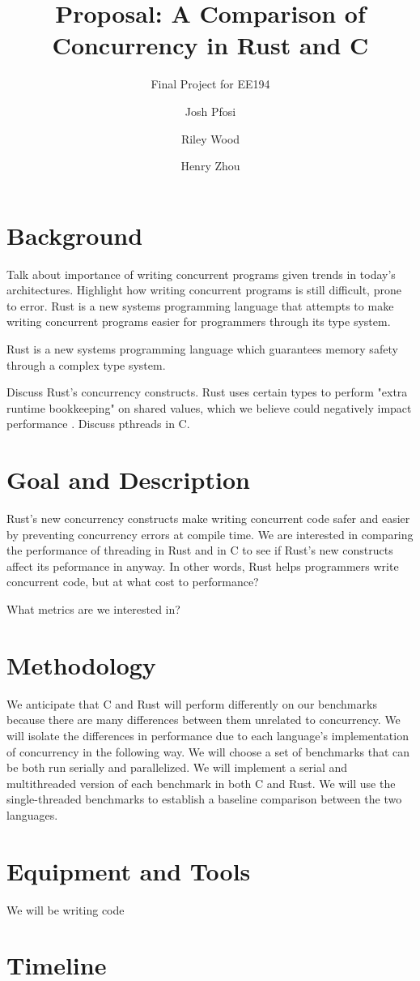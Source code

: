 \documentclass{scrartcl}
\title{Proposal: A Comparison of Concurrency in Rust and C}
\subtitle{Final Project for EE194}
\author{
    Josh Pfosi\\
    \and
    Riley Wood\\
    \and
    Henry Zhou\\
}
\begin{document}
\maketitle


\section*{Background}
Talk about importance of writing concurrent programs given trends in today's architectures. Highlight how writing concurrent programs is still difficult, prone to error. Rust is a new systems programming language that attempts to make writing concurrent programs easier for programmers through its type system. 

Rust is a new systems programming language which guarantees memory safety through a complex type system. 

Discuss Rust's concurrency constructs. Rust uses certain types to perform "extra runtime bookkeeping" on shared values, which we believe could negatively impact performance \cite{rust-lang.org}. Discuss pthreads in C.

\section*{Goal and Description}
Rust's new concurrency constructs make writing concurrent code safer and easier by preventing concurrency errors at compile time. We are interested in comparing the performance of threading in Rust and in C to see if Rust's new constructs affect its peformance in anyway. In other words, Rust helps programmers write concurrent code, but at what cost to performance?

What metrics are we interested in?

\section*{Methodology}
We anticipate that C and Rust will perform differently on our benchmarks because there are many differences between them unrelated to concurrency. We will isolate the differences in performance due to each language's implementation of concurrency in the following way. We will choose a set of benchmarks that can be both run serially and parallelized. We will implement a serial and multithreaded version of each benchmark in both C and Rust. We will use the single-threaded benchmarks to
establish a baseline comparison between the two languages.

\section*{Equipment and Tools}
We will be writing code 

\section*{Timeline}




\end{document}
